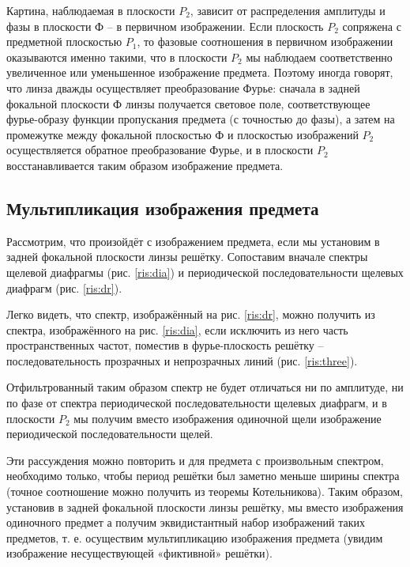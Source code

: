 \documentclass[a5paper,10pt, twoside]{article} %
\begin{document}
		Картина, наблюдаемая в плоскости $P_2$, зависит от распределения амплитуды и фазы в плоскости
		Ф -- в первичном изображении. Если плоскость $P_2$ сопряжена с предметной плоскостью
		$P_1$, то фазовые соотношения в первичном изображении оказываются именно такими, что в 
		плоскости $P_2$ мы наблюдаем соответственно увеличенное или уменьшенное изображение предмета. 
		Поэтому иногда говорят, что линза дважды осуществляет преобразование Фурье: сначала в задней 
		фокальной плоскости Ф линзы получается световое
		поле, соответствующее фурье-образу функции пропускания предмета (с точностью до фазы),	а 
		затем на промежутке между фокальной плоскостью Ф и плоскостью изображений $P_2$ 
		осуществляется обратное преобразование Фурье, и в плоскости $P_2$ восстанавливается таким 
		образом	изображение предмета.
		
		
	\subsection{Мультипликация изображения предмета}
	
		Рассмотрим, что произойдёт с изображением предмета, если мы	установим в задней фокальной 
		плоскости линзы решётку. Сопоставим вначале спектры щелевой диафрагмы (рис. \ref{ris:dia}) и 
		периодической последовательности щелевых диафрагм (рис. \ref{ris:dr}).
		
		Легко видеть, что спектр, изображённый на рис. \ref{ris:dr}, можно получить из спектра, 
		изображённого на рис. \ref{ris:dia}, если исключить из него часть пространственных частот, 
		поместив в фурье-плоскость решётку -- последовательность прозрачных и непрозрачных линий 
		(рис. \ref{ris:three}).
		
		Отфильтрованный таким образом спектр не будет отличаться ни по амплитуде, ни по фазе от 
		спектра периодической последовательности щелевых диафрагм, и в плоскости $P_2$ мы получим 
		вместо изображения одиночной щели изображение периодической последовательности щелей.
		
		Эти рассуждения можно повторить и для предмета с произвольным спектром, необходимо только, 
		чтобы период решётки был заметно меньше ширины спектра (точное соотношение можно получить из 
		теоремы Котельникова). Таким образом, установив в задней фокальной плоскости линзы решётку, 
		мы вместо изображения одиночного предмет а получим эквидистантный набор изображений таких 
		предметов, т. е. осуществим мультипликацию изображения предмета (увидим изображение	
		несуществующей «фиктивной» решётки).
		
\end{document}
